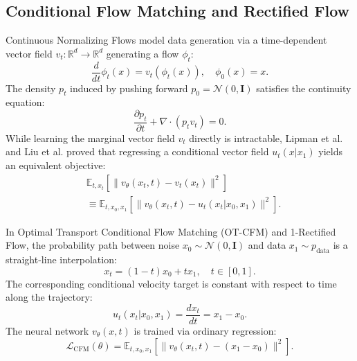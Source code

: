 \documentclass[conference]{IEEEtran}
\begin{document}
\subsection{Conditional Flow Matching and Rectified Flow}
Continuous Normalizing Flows model data generation via a time-dependent vector field $v_t: \mathbb{R}^d \to \mathbb{R}^d$ generating a flow $\phi_t$:
\begin{equation}
\frac{d}{dt} \phi_t(x) = v_t(\phi_t(x)), \quad \phi_0(x) = x.
\end{equation}
The density $p_t$ induced by pushing forward $p_0 = \mathcal{N}(0, \mathbf{I})$ satisfies the continuity equation:
\begin{equation}
\frac{\partial p_t}{\partial t} + \nabla \cdot (p_t v_t) = 0.
\end{equation}
While learning the marginal vector field $v_t$ directly is intractable, Lipman et al. \cite{lipman2022flow} and Liu et al. \cite{liu2022flow} proved that regressing a conditional vector field $u_t(x | x_1)$ yields an equivalent objective:
\begin{equation}
\begin{aligned}
&\mathbb{E}_{t, x_t} \left[ \| v_\theta(x_t, t) - v_t(x_t) \|^2 \right] \\
&\equiv \mathbb{E}_{t, x_0, x_1} \left[ \| v_\theta(x_t, t) - u_t(x_t | x_0, x_1) \|^2 \right].
\end{aligned}
\end{equation}

In Optimal Transport Conditional Flow Matching (OT-CFM) and 1-Rectified Flow, the probability path between noise $x_0 \sim \mathcal{N}(0, \mathbf{I})$ and data $x_1 \sim p_{\text{data}}$ is a straight-line interpolation:
\begin{equation}
x_t = (1 - t) x_0 + t x_1, \quad t \in [0, 1].
\end{equation}
The corresponding conditional velocity target is constant with respect to time along the trajectory:
\begin{equation}
u_t(x_t | x_0, x_1) = \frac{d x_t}{dt} = x_1 - x_0.
\end{equation}
The neural network $v_\theta(x, t)$ is trained via ordinary regression:
\begin{equation}
\mathcal{L}_{\text{CFM}}(\theta) = \mathbb{E}_{t, x_0, x_1} \left[ \| v_\theta(x_t, t) - (x_1 - x_0) \|^2 \right].
\end{equation}
\end{document}
